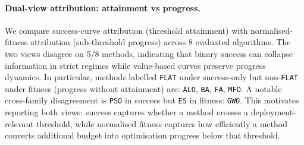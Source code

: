 \paragraph{Dual-view attribution: attainment vs progress.}
We compare success-curve attribution (threshold attainment) with normalised-fitness attribution (sub-threshold progress) across 8 evaluated algorithms. The two views disagree on 5/8 methods, indicating that binary success can collapse information in strict regimes while value-based curves preserve progress dynamics. In particular, methods labelled \texttt{FLAT} under success-only but non-\texttt{FLAT} under fitness (progress without attainment) are: \texttt{ALO}, \texttt{BA}, \texttt{FA}, \texttt{MFO}. A notable cross-family disagreement is \texttt{PSO} in success but \texttt{ES} in fitness: \texttt{GWO}. This motivates reporting both views: success captures whether a method crosses a deployment-relevant threshold, while normalised fitness captures how efficiently a method converts additional budget into optimisation progress below that threshold.
